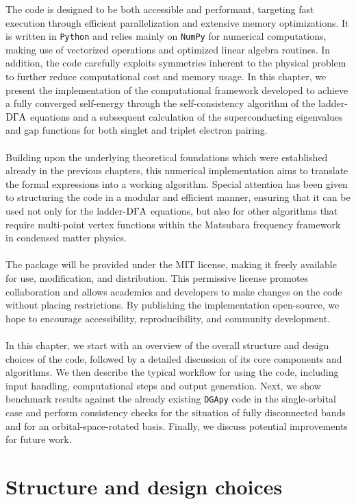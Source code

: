 \documentclass[../../main.tex]{subfiles}
\begin{document}
The code is designed to be both accessible and performant, targeting fast execution through efficient parallelization and extensive memory optimizations. It is written in \texttt{Python} and relies mainly on \texttt{NumPy} for numerical computations, making use of vectorized operations and optimized linear algebra routines. In addition, the code carefully exploits symmetries inherent to the physical problem to further reduce computational cost and memory usage. In this chapter, we present the implementation of the computational framework developed to achieve a fully converged self-energy through the self-consistency algorithm of the ladder-$\text{D}\Gamma\text{A}$ equations and a subsequent calculation of the superconducting eigenvalues and gap functions for both singlet and triplet electron pairing. 
\\\\
Building upon the underlying theoretical foundations which were established already in the previous chapters, this numerical implementation aims to translate the formal expressions into a working algorithm. Special attention has been given to structuring the code in a modular and efficient manner, ensuring that it can be used not only for the ladder-$\text{D}\Gamma\text{A}$ equations, but also for other algorithms that require multi-point vertex functions within the Matsubara frequency framework in condensed matter physics.
\\\\
The package will be provided under the MIT license, making it freely available for use, modification, and distribution. This permissive license promotes collaboration and allows academics and developers to make changes on the code without placing restrictions. By publishing the implementation open-source, we hope to encourage accessibility, reproducibility, and community development.
\\\\
In this chapter, we start with an overview of the overall structure and design choices of the code, followed by a detailed discussion of its core components and algorithms. We then describe the typical workflow for using the code, including input handling, computational steps and output generation. Next, we show benchmark results against the already existing \texttt{DGApy} code in the single-orbital case and perform consistency checks for the situation of fully disconnected bands and for an orbital-space-rotated basis. Finally, we discuss potential improvements for future work.

\section{Structure and design choices}\label{sec:code_design_choices}
\end{document}
